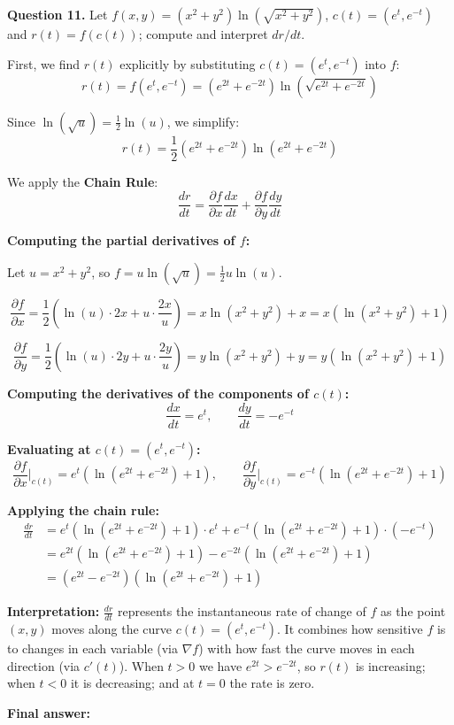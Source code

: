 \textbf{Question 11.} Let $f(x,y) = (x^2 + y^2)\ln(\sqrt{x^2 + y^2})$, $c(t) = (e^t, e^{-t})$ and $r(t) = f(c(t))$; compute and interpret $dr/dt$.
\begin{respuesta}

First, we find $r(t)$ explicitly by substituting $c(t) = (e^t, e^{-t})$ into $f$:
$$r(t) = f(e^t, e^{-t}) = (e^{2t} + e^{-2t})\ln\!\left(\sqrt{e^{2t} + e^{-2t}}\right)$$

Since $\ln(\sqrt{u}) = \frac{1}{2}\ln(u)$, we simplify:
$$r(t) = \frac{1}{2}(e^{2t} + e^{-2t})\ln(e^{2t} + e^{-2t})$$

We apply the \textbf{Chain Rule}:
$$\frac{dr}{dt} = \frac{\partial f}{\partial x}\frac{dx}{dt} + \frac{\partial f}{\partial y}\frac{dy}{dt}$$

\textbf{Computing the partial derivatives of $f$:}

Let $u = x^2 + y^2$, so $f = u \ln(\sqrt{u}) = \frac{1}{2}u\ln(u)$.

$$\frac{\partial f}{\partial x} = \frac{1}{2}\left(\ln(u) \cdot 2x + u \cdot \frac{2x}{u}\right) = x\ln(x^2+y^2) + x = x\left(\ln(x^2+y^2) + 1\right)$$

$$\frac{\partial f}{\partial y} = \frac{1}{2}\left(\ln(u) \cdot 2y + u \cdot \frac{2y}{u}\right) = y\ln(x^2+y^2) + y = y\left(\ln(x^2+y^2) + 1\right)$$

\textbf{Computing the derivatives of the components of $c(t)$:}
$$\frac{dx}{dt} = e^t, \qquad \frac{dy}{dt} = -e^{-t}$$

\textbf{Evaluating at $c(t) = (e^t, e^{-t})$:}
$$\frac{\partial f}{\partial x}\bigg|_{c(t)} = e^t\left(\ln(e^{2t}+e^{-2t})+1\right), \qquad \frac{\partial f}{\partial y}\bigg|_{c(t)} = e^{-t}\left(\ln(e^{2t}+e^{-2t})+1\right)$$

\textbf{Applying the chain rule:}
\begin{align*}
\frac{dr}{dt} &= e^t\!\left(\ln(e^{2t}+e^{-2t})+1\right)\cdot e^t + e^{-t}\!\left(\ln(e^{2t}+e^{-2t})+1\right)\cdot(-e^{-t})\\
&= e^{2t}\!\left(\ln(e^{2t}+e^{-2t})+1\right) - e^{-2t}\!\left(\ln(e^{2t}+e^{-2t})+1\right)\\
&= \left(e^{2t}-e^{-2t}\right)\!\left(\ln(e^{2t}+e^{-2t})+1\right)
\end{align*}

\textbf{Interpretation:} $\frac{dr}{dt}$ represents the instantaneous rate of change of $f$ as the point $(x,y)$ moves along the curve $c(t)=(e^t,e^{-t})$. It combines how sensitive $f$ is to changes in each variable (via $\nabla f$) with how fast the curve moves in each direction (via $c'(t)$). When $t>0$ we have $e^{2t}>e^{-2t}$, so $r(t)$ is increasing; when $t<0$ it is decreasing; and at $t=0$ the rate is zero.

    \textbf{Final answer:}
    \begin{center}
    \end{center}
\end{respuesta}






